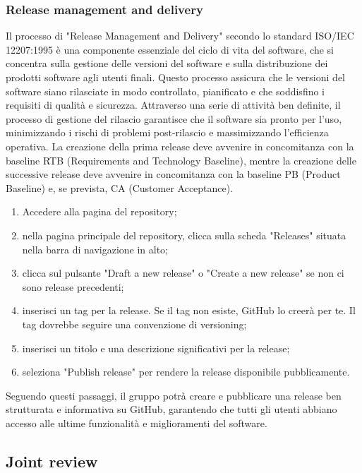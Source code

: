 \subsubsection{Release management and delivery}
Il processo di "Release Management and Delivery" secondo lo standard ISO/IEC 12207:1995 è una componente essenziale del ciclo di vita del software, che si concentra sulla gestione delle versioni del software e sulla distribuzione dei prodotti software agli utenti finali. Questo processo assicura che le versioni del software siano rilasciate in modo controllato, pianificato e che soddisfino i requisiti di qualità e sicurezza. Attraverso una serie di attività ben definite, il processo di gestione del rilascio garantisce che il software sia pronto per l'uso, minimizzando i rischi di problemi post-rilascio e massimizzando l'efficienza operativa. La creazione della prima release deve avvenire in concomitanza con la baseline RTB (Requirements and Technology Baseline), mentre la creazione delle successive release deve avvenire in concomitanza con la baseline PB (Product Baseline) e, se prevista, CA (Customer Acceptance).

\begin{enumerate}
	\item Accedere alla pagina del repository;
	\item nella pagina principale del repository, clicca sulla scheda "Releases" situata nella barra di navigazione in alto;
	\item clicca sul pulsante "Draft a new release" o "Create a new release" se non ci sono release precedenti;
	\item inserisci un tag per la release. Se il tag non esiste, GitHub lo creerà per te. Il tag dovrebbe seguire una convenzione di versioning;
	\item inserisci un titolo e una descrizione significativi per la release;
	\item seleziona "Publish release" per rendere la release disponibile pubblicamente.
\end{enumerate}
Seguendo questi passaggi, il gruppo potrà creare e pubblicare una release ben strutturata e informativa su GitHub, garantendo che tutti gli utenti abbiano accesso alle ultime funzionalità e miglioramenti del software.

\subsection{Joint review}
